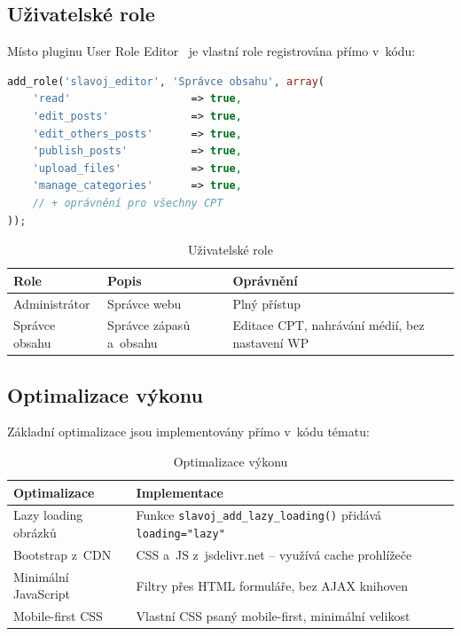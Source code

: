 \documentclass[12pt,a4paper]{article}
\begin{document}
\subsection{Uživatelské role}

Místo pluginu User Role Editor~\cite{roleeditor} je vlastní role registrována přímo v~kódu:

\begin{lstlisting}[language=PHP]
add_role('slavoj_editor', 'Správce obsahu', array(
    'read'                   => true,
    'edit_posts'             => true,
    'edit_others_posts'      => true,
    'publish_posts'          => true,
    'upload_files'           => true,
    'manage_categories'      => true,
    // + oprávnění pro všechny CPT
));
\end{lstlisting}

\begin{table}[H]
\centering
\begin{tabularx}{\textwidth}{l l X}
\toprule
\textbf{Role} & \textbf{Popis} & \textbf{Oprávnění} \\
\midrule
Administrátor & Správce webu & Plný přístup \\
Správce obsahu & Správce zápasů a~obsahu & Editace CPT, nahrávání médií, bez nastavení WP \\
\bottomrule
\end{tabularx}
\caption{Uživatelské role}
\end{table}

\subsection{Optimalizace výkonu}

Základní optimalizace jsou implementovány přímo v~kódu tématu:

\begin{table}[H]
\centering
\begin{tabularx}{\textwidth}{l X}
\toprule
\textbf{Optimalizace} & \textbf{Implementace} \\
\midrule
Lazy loading obrázků & Funkce \texttt{slavoj\_add\_lazy\_loading()} přidává \texttt{loading="lazy"}~\cite{lazyload} \\
Bootstrap z~CDN & CSS a~JS z~jsdelivr.net -- využívá cache prohlížeče~\cite{jsdelivr} \\
Minimální JavaScript & Filtry přes HTML formuláře, bez AJAX knihoven \\
Mobile-first CSS & Vlastní CSS psaný mobile-first, minimální velikost \\
\bottomrule
\end{tabularx}
\caption{Optimalizace výkonu}
\end{table}
\end{document}
